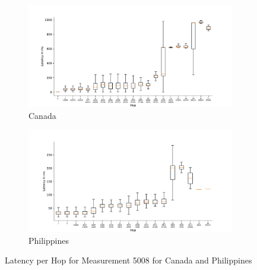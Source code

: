 \begin{figure}
	\centering
	\begin{subfigure}[b]{\linewidth}
		\includegraphics[width=\linewidth]{chapters/4-results/traceroute/img/latency-per-hop-CA-5008.pdf}
		\caption{Canada}
	\end{subfigure}
	\begin{subfigure}[b]{\linewidth}
		\includegraphics[width=\linewidth]{chapters/4-results/traceroute/img/latency-per-hop-PH-5008.pdf}
		\caption{Philippines}
	\end{subfigure}
	\caption{Latency per Hop for Measurement 5008 for Canada and
		Philippines}
	\label{fig:latency-change-per-hop-appendix-7}
\end{figure}

